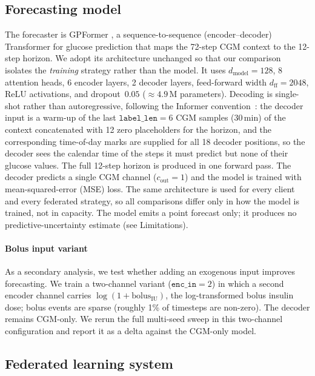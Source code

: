\documentclass[10pt,letterpaper]{article}
\begin{document}
\subsection*{Forecasting model}

The forecaster is GPFormer \cite{zhu2024gpformer}, a sequence-to-sequence
(encoder--decoder) Transformer for glucose prediction that maps the 72-step CGM
context to the 12-step horizon. We adopt its architecture unchanged so that our
comparison isolates the \emph{training} strategy rather than the model. It uses
$d_{\text{model}}=128$, 8 attention heads, 6 encoder layers, 2 decoder layers,
feed-forward width $d_{\text{ff}}=2048$, ReLU activations, and dropout~$0.05$
($\approx 4.9$\,M parameters). Decoding is single-shot rather than
autoregressive, following the Informer convention~\cite{zhou2021informer}: the
decoder input is a warm-up of the last $\texttt{label\_len}=6$ CGM samples
(30\,min) of the context concatenated with 12 zero placeholders for the horizon,
and the corresponding time-of-day marks are supplied for all 18 decoder
positions, so the decoder sees the calendar time of the steps it must predict but
none of their glucose values. The full 12-step horizon is produced in one forward
pass. The decoder predicts a single CGM channel ($c_{\text{out}}=1$) and the
model is trained with mean-squared-error (MSE) loss. The same architecture is
used for every client and every federated strategy, so all comparisons differ
only in how the model is trained, not in capacity. The model emits a point
forecast only; it produces no predictive-uncertainty estimate (see Limitations).

\paragraph{Bolus input variant}
As a secondary analysis, we test whether adding an exogenous input improves
forecasting. We train a two-channel variant ($\texttt{enc\_in}=2$) in which a
second encoder channel carries $\log(1+\mathrm{bolus}_{\mathrm{IU}})$, the
log-transformed bolus insulin dose; bolus events are sparse (roughly 1\% of
timesteps are non-zero). The decoder remains CGM-only. We rerun the full
multi-seed sweep in this two-channel configuration and report it as a delta
against the CGM-only model.

\subsection*{Federated learning system}
\end{document}
